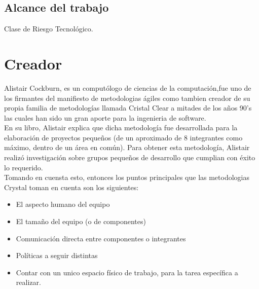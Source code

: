 \documentclass[12pt,a4paper]{article}
\begin{document}
	\subsection{Alcance del trabajo}
	Clase de Riesgo Tecnol\'ogico.
	\pagebreak
	
	\section{Creador}
	Alistair Cockburn, es un comput\'ologo de ciencias de la computaci\'on,fue uno de los firmantes del manifiesto de metodologias \'agiles como tambien creador de su propia familia de metodolog\'ias llamada Cristal Clear a mitades de los a\~nos 90's las cuales han sido un gran aporte para la ingenieria de software.
	\\
	En su libro, Alistair explica que dicha metodolog\'ia fue desarrollada para la elaboraci\'on de proyectos peque\~nos (de un aproximado de 8 integrantes como máximo, dentro de un \'area en com\'un).
	Para obtener esta metodolog\'ia, Alistair realiz\'o investigaci\'on sobre grupos peque\~nos de desarrollo que cumplian con \'exito lo requerido.\\
	Tomando en cuensta esto, entonces los puntos principales que las metodologias Crystal toman en cuenta son los siguientes:\\
	\begin{itemize}		
		\item El aspecto humano del equipo

		\item El tamaño del equipo (o de componentes)		
	
		\item Comunicación directa entre componentes o integrantes
		
		\item Políticas a seguir distintas
	
		\item Contar con un unico espacio físico de trabajo, para la tarea específica a realizar.
	\end{itemize}
\end{document}
